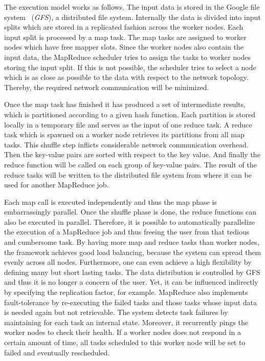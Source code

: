 The execution model works as follows.
The input data is stored in the Google file system~\cite{ghemawat:2003a} (\emph{GFS}), a distributed file system.
Internally the data is divided into input splits which are stored in a replicated fashion across the worker nodes.
Each input split is processed by a map task.
The map tasks are assigned to worker nodes which have free mapper slots.
Since the worker nodes also contain the input data, the MapReduce scheduler tries to assign the tasks to worker nodes storing the input split.
If this is not possible, the scheduler tries to select a node which is as close as possible to the data with respect to the network topology.
Thereby, the required network communication will be minimized.

Once the map task has finished it has produced a set of intermediate results, which is partitioned according to a given hash function.
Each partition is stored locally in a temporary file and serves as the input of one reduce task.
A reduce task which is spawned on a worker node retrieves its partitions from all map tasks.
This shuffle step inflicts considerable network communication overhead.
Then the key-value pairs are sorted with respect to the key value.
And finally the reduce function will be called on each group of key-value pairs.
The result of the reduce tasks will be written to the distributed file system from where it can be used for another MapReduce job.

Each map call is executed independently and thus the map phase is embarrassingly parallel.
Once the shuffle phase is done, the reduce functions can also be executed in parallel.
Therefore, it is possible to automatically parallelize the execution of a MapReduce job and thus freeing the user from that tedious and cumbersome task.
By having more map and reduce tasks than worker nodes, the framework achieves good load balancing, because the system can spread them evenly across all nodes.
Furthermore, one can even achieve a high flexibility by defining many but short lasting tasks.
The data distribution is controlled by GFS and thus it is no longer a concern of the user.
Yet, it can be influenced indirectly by specifying the replication factor, for example.
MapReduce also implements fault-tolerance by re-executing the failed tasks and those tasks whose input data is needed again but not retrievable.
The system detects task failures by maintaining for each task an internal state.
Moreover, it recurrently pings the worker nodes to check their health.
If a worker nodes does not respond in a certain amount of time, all tasks scheduled to this worker node will be set to failed and eventually rescheduled.

